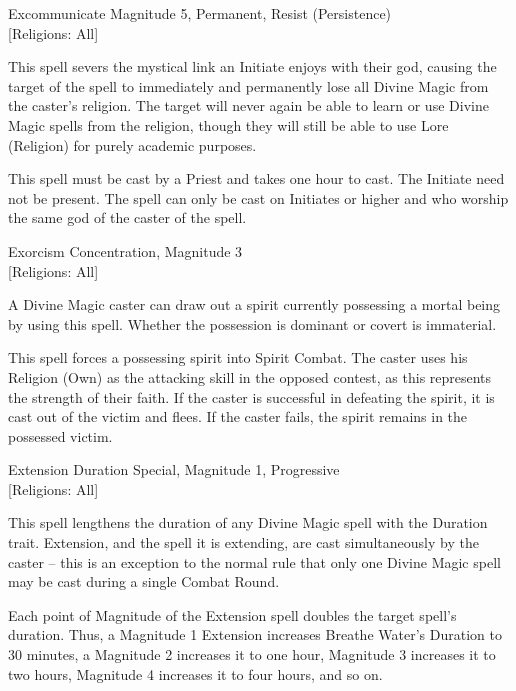 \begin{rpg-spell}
{Excommunicate}
{Magnitude 5, Permanent, Resist (Persistence)\\{[Religions: All]}}

This spell severs the mystical link an Initiate enjoys with their god, causing the target of the spell to immediately and permanently lose all Divine Magic from the caster’s religion. The target will never again be able to learn or use Divine Magic spells from the religion, though they will still be able to use Lore (Religion) for purely academic purposes. 

This spell must be cast by a Priest and takes one hour to cast. The Initiate need not be present. The spell can only be cast on Initiates or higher and who worship the same god of the caster of the spell.
\end{rpg-spell}

\begin{rpg-spell}
{Exorcism}
{Concentration, Magnitude 3\\{[Religions: All]}}

A Divine Magic caster can draw out a spirit currently possessing a mortal being by using this spell. Whether the possession is dominant or covert is immaterial.

This spell forces a possessing spirit into Spirit Combat. The caster uses his Religion (Own) as the attacking skill in the opposed contest, as this represents the strength of their faith. If the caster is successful in defeating the spirit, it is cast out of the victim and flees. If the caster fails, the spirit remains in the possessed victim.
\end{rpg-spell}

\begin{rpg-spell}
{Extension}
{Duration Special, Magnitude 1, Progressive\\{[Religions: All]}}

This spell lengthens the duration of any Divine Magic spell with the Duration trait. Extension, and the spell it is extending, are cast simultaneously by the caster – this is an exception to the normal rule that only one Divine Magic spell may be cast during a single Combat Round. 

Each point of Magnitude of the Extension spell doubles the target spell’s duration. Thus, a Magnitude 1 Extension increases Breathe Water’s Duration to 30 minutes, a Magnitude 2 increases it to one hour, Magnitude 3 increases it to two hours, Magnitude 4 increases it to four hours, and so on.
\end{rpg-spell}

